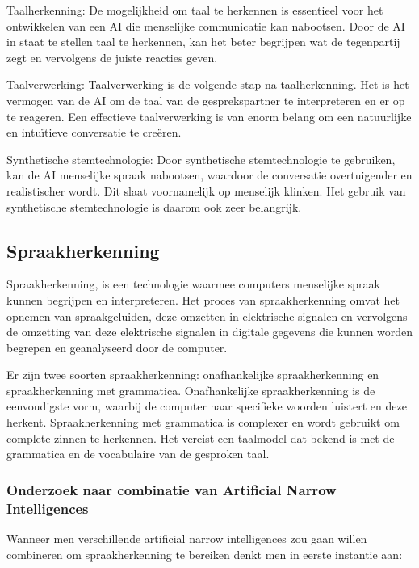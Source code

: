 Taalherkenning: De mogelijkheid om taal te herkennen is essentieel voor het ontwikkelen van een AI die menselijke communicatie kan nabootsen. Door de AI in staat te stellen taal te herkennen, kan het beter begrijpen wat de tegenpartij zegt en vervolgens de juiste reacties geven.

Taalverwerking: Taalverwerking is de volgende stap na taalherkenning. Het is het vermogen van de AI om de taal van de gesprekspartner te interpreteren en er op te reageren. Een effectieve taalverwerking is van enorm belang om een natuurlijke en intuïtieve conversatie te creëren.

Synthetische stemtechnologie: Door synthetische stemtechnologie te gebruiken, kan de AI menselijke spraak nabootsen, waardoor de conversatie overtuigender en realistischer wordt. Dit slaat voornamelijk op menselijk klinken. Het gebruik van synthetische stemtechnologie is daarom ook zeer belangrijk.

\newpage

\subsection{Spraakherkenning}

Spraakherkenning, is een technologie waarmee computers menselijke spraak kunnen begrijpen en interpreteren. Het proces van spraakherkenning omvat het opnemen van spraakgeluiden, deze omzetten in elektrische signalen en vervolgens de omzetting van deze elektrische signalen in digitale gegevens die kunnen worden begrepen en geanalyseerd door de computer.

Er zijn twee soorten spraakherkenning: onafhankelijke spraakherkenning en spraakherkenning met grammatica. Onafhankelijke spraakherkenning is de eenvoudigste vorm, waarbij de computer naar specifieke woorden luistert en deze herkent. Spraakherkenning met grammatica is complexer en wordt gebruikt om complete zinnen te herkennen. Het vereist een taalmodel dat bekend is met de grammatica en de vocabulaire van de gesproken taal.

\subsubsection{Onderzoek naar combinatie van Artificial Narrow Intelligences}

Wanneer men verschillende artificial narrow intelligences zou gaan willen combineren om spraakherkenning te bereiken denkt men in eerste instantie aan:

